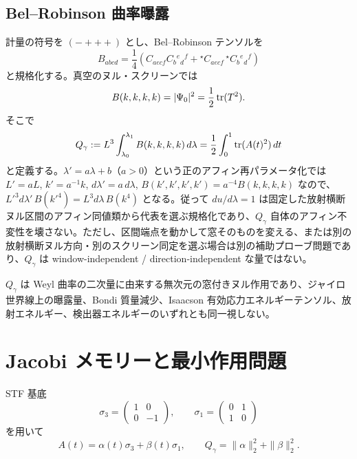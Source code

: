 \subsection{Bel--Robinson 曲率曝露}
計量の符号を $(-+++)$ とし、Bel--Robinson テンソルを
\begin{equation}
B_{abcd}=\frac14\left(C_{aecf}C_b{}^e{}_d{}^f+{}^\star C_{aecf}\,{}^\star C_b{}^e{}_d{}^f\right)
\label{eq:BR-def}
\end{equation}
と規格化する。真空のヌル・スクリーンでは
\begin{equation}
B(k,k,k,k)=|\Psi_0|^2=\frac12\operatorname{tr}(T^2).
\label{eq:BR-tidal}
\end{equation}
そこで
\begin{equation}
Q_\gamma:=L^3\int_{\lambda_0}^{\lambda_1}B(k,k,k,k)\,d\lambda
=\frac12\int_0^1\operatorname{tr}(A(t)^2)\,dt
\label{eq:Q}
\end{equation}
と定義する。$\lambda'=a\lambda+b$（$a>0$）という正のアフィン再パラメータ化では
$L'=aL$, $k'=a^{-1}k$, $d\lambda'=a\,d\lambda$,
$B(k',k',k',k')=a^{-4}B(k,k,k,k)$ なので、
$L'^3d\lambda'\,B(k'^4)=L^3d\lambda\,B(k^4)$ となる。従って $du/d\lambda=1$ は固定した放射横断ヌル区間のアフィン同値類から代表を選ぶ規格化であり、$Q_\gamma$ 自体のアフィン不変性を壊さない。ただし、区間端点を動かして窓そのものを変える、または別の放射横断ヌル方向・別のスクリーン同定を選ぶ場合は別の補助プローブ問題であり、$Q_\gamma$ は window-independent / direction-independent な量ではない。

\begin{remark}
$Q_\gamma$ は Weyl 曲率の二次量に由来する無次元の窓付きヌル作用であり、ジャイロ世界線上の曝露量、Bondi 質量減少、Isaacson 有効応力エネルギーテンソル、放射エネルギー、検出器エネルギーのいずれとも同一視しない。
\end{remark}

\section{Jacobi メモリーと最小作用問題}
STF 基底
\[
\sigma_3=\begin{pmatrix}1&0\\0&-1\end{pmatrix},\qquad
\sigma_1=\begin{pmatrix}0&1\\1&0\end{pmatrix}
\]
を用いて
\begin{equation}
A(t)=\alpha(t)\sigma_3+\beta(t)\sigma_1,
\qquad Q_\gamma=\|\alpha\|_2^2+\|\beta\|_2^2.
\label{eq:control}
\end{equation}

